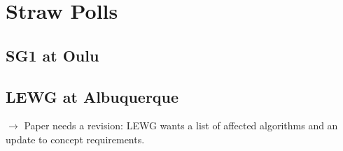 
\section{Straw Polls}
\subsection{SG1 at Oulu}

\subsection{LEWG at Albuquerque}
\noindent$\rightarrow$ Paper needs a revision: LEWG wants a list of affected algorithms and an update to concept requirements.





